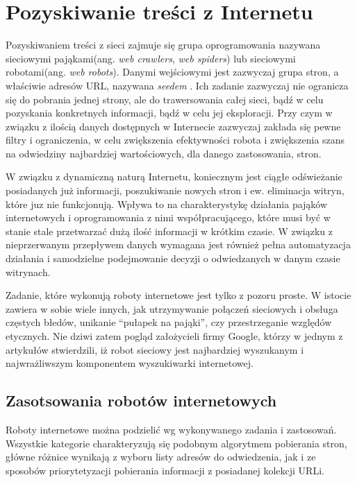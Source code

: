 \chapter{Pozyskiwanie treści z Internetu}
\label{cha:pozyskiwanieTresci}

Pozyskiwaniem treści z sieci zajmuje się grupa oprogramowania nazywana sieciowymi pająkami(ang. \emph{web crawlers}, \emph{web spiders}) lub sieciowymi robotami(ang. \emph{web robots}). Danymi wejściowymi jest zazwyczaj grupa stron, a właściwie adresów URL, nazywana \emph{seedem} \cite{webCrawling}. Ich zadanie zazwyczaj nie ogranicza się do pobrania jednej strony, ale do trawersowania całej sieci, bądź w celu pozyskania konkretnych informacji, bądź w celu jej eksploracji. Przy czym w związku z ilością danych dostępnych w Internecie zazwyczaj zakłada się pewne filtry i ograniczenia, w celu zwiększenia efektywności robota i zwiększenia szans na odwiedziny najbardziej wartościowych, dla danego zastosowania, stron.

W związku z dynamiczną naturą Internetu, koniecznym jest ciągłe odświeżanie posiadanych już informacji, poszukiwanie nowych stron i ew. eliminacja witryn, które juz nie funkcjonują. Wpływa to na charakterystykę działania pająków internetowych i oprogramowania z nimi współpracującego, które musi być w stanie stale przetwarzać dużą ilość informacji w krótkim czasie. W związku z nieprzerwanym przepływem danych wymagana jest również pełna automatyzacja działania i samodzielne podejmowanie decyzji o odwiedzanych w danym czasie witrynach.

Zadanie, które wykonują roboty internetowe jest tylko z pozoru proste. W istocie zawiera w sobie wiele innych, jak utrzymywanie połączeń sieciowych i obsługa częstych błedów, unikanie ``pułapek na pająki'', czy przestrzeganie względów etycznych. Nie dziwi zatem pogląd założycieli firmy Google, którzy w jednym z artykułów stwierdzili, iż robot sieciowy jest najbardziej wyszukanym i najwrażliwszym komponentem wyszukiwarki internetowej\cite{BrinLawrence}.


\section{Zasotsowania robotów internetowych}
\label{sec:podzialRobotow}
Roboty internetowe można podzielić wg wykonywanego zadania i zastosowań. Wszystkie kategorie charakteryzują się podobnym algorytmem pobierania stron, główne różnice wynikają z wyboru listy adresów do odwiedzenia, jak i ze sposobów priorytetyzacji pobierania informacji z posiadanej kolekcji URLi.

